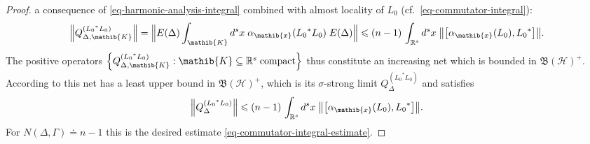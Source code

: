 \documentclass[11pt,twoside,openright]{report}
\theoremstyle{definition}
\theoremstyle{plain}
\theoremstyle{remark}
\theoremstyle{assumption}
\newcommand{\Bset}[1]{\Bigl\{ #1 \Bigr\}}
\newcommand{\bcomm}[2]{\bigl[ #1 , #2 \bigr]}
\newcommand{\bnorm}[1]{\bigl\lVert #1 \bigr\rVert}
\newcommand{\Bnorm}[1]{\Bigl\lVert #1 \Bigr\rVert}
\newcommand{\Kib}{\mathib{K}}
\newcommand{\Rs}{\mathbb{R}^s}
\newcommand{\BH}{\mathfrak{B} ( \mathscr{H} )}
\newcommand{\ED}{E ( \Delta )}
\newcommand{\aibx}{\alpha_\mathib{x}}
\begin{document}
\begin{proof}
  a consequence of \eqref{eq-harmonic-analysis-integral} combined with
  almost locality of $L_0$ (cf.~\eqref{eq-commutator-integral}):
  \begin{equation}
    \label{eq-harmonic-analysis-commutator-estimate}
    \Bnorm{Q_{\Delta , \Kib}^{( {L_0}^* L_0 )}} = \Bnorm{\ED \int_\Kib
      d^s x \; \aibx ( {L_0}^* L_0 ) \; \ED} \leqslant ( n - 1 ) \,
    \int_{\Rs} d^s x \; \bnorm{\bcomm{\aibx ( L_0 )}{{L_0}^*}}
    \text{.}
  \end{equation}
  The positive operators $\Bset{Q_{\Delta , \Kib}^{( {L_0}^* L_0 )} :
  \Kib \subseteq \Rs \; \text{compact}}$ thus constitute an increasing
  net which is bounded in $\BH^+$. According to
  \cite[Lemma~2.4.19]{bratteli/robinson:1987} this net has a least
  upper bound in $\BH^+$, which is its $\sigma$-strong limit
  $Q_\Delta^{( {L_0}^* L_0 )}$ and satisfies
  \begin{equation}
    \label{eq-commutator-integral-bound}
    \Bnorm{Q_\Delta^{( {L_0}^* L_0 )}} \leqslant ( n - 1 ) \,
    \int_{\Rs} d^s x \; \bnorm{\bcomm{\aibx ( L_0 )}{{L_0}^*}}
    \text{.}
  \end{equation}
  For $N ( \Delta , \Gamma ) \doteq n - 1$ this is the desired
  estimate \eqref{eq-commutator-integral-estimate}.


\end{proof}
\end{document}
